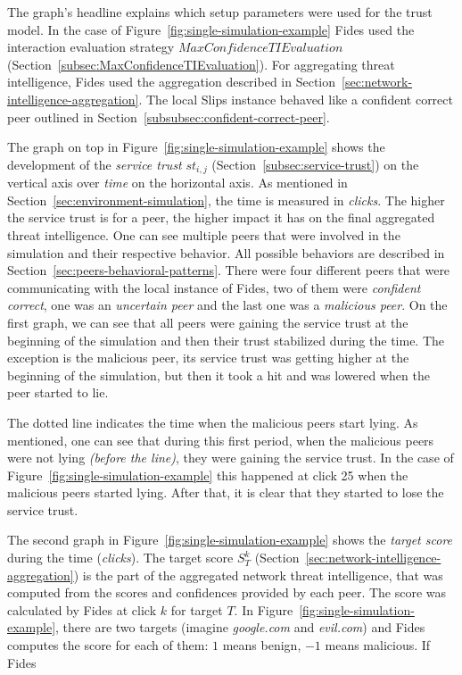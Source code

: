 The graph's headline explains which setup parameters were used for the trust model. In the case of Figure~\ref{fig:single-simulation-example} Fides used the interaction evaluation strategy $MaxConfidenceTIEvaluation$ (Section~\ref{subsec:MaxConfidenceTIEvaluation}).
For aggregating threat intelligence, Fides used the aggregation described in Section~\ref{sec:network-intelligence-aggregation}.
The local Slips instance behaved like a confident correct peer outlined in Section~\ref{subsubsec:confident-correct-peer}.

The graph on top in Figure~\ref{fig:single-simulation-example} shows the development of the \textit{service trust} $st_{i, j}$ (Section~\ref{subsec:service-trust}) on the vertical axis over \textit{time} on the horizontal axis. As mentioned in Section~\ref{sec:environment-simulation}, the time is measured in \textit{clicks}.
The higher the service trust is for a peer, the higher impact it has on the final aggregated threat intelligence.
One can see multiple peers that were involved in the simulation and their respective behavior. All possible behaviors are described in Section~\ref{sec:peers-behavioral-patterns}.
There were four different peers that were communicating with the local instance of Fides, two of them were \textit{confident correct}, one was an \textit{uncertain peer} and the last one was a \textit{malicious peer}.
On the first graph, we can see that all peers were gaining the service trust at the beginning of the simulation and then their trust stabilized during the time. The exception is the malicious peer, its service trust was getting higher at the beginning of the simulation, but then it took a hit and was lowered when the peer started to lie. 

The dotted line indicates the time when the malicious peers start lying.
As mentioned, one can see that during this first period, when the malicious peers were not lying \textit{(before the line)}, they were gaining the service trust.
In the case of Figure~\ref{fig:single-simulation-example} this happened at click 25 when the malicious peers started lying.
After that, it is clear that they started to lose the service trust.

The second graph in Figure~\ref{fig:single-simulation-example} shows the \textit{target score} during the time (\textit{clicks}).
The target score $S^{k}_{T}$ (Section~\ref{sec:network-intelligence-aggregation}) is the part of the aggregated network threat intelligence, that was computed from the scores and confidences provided by each peer. The score was calculated by Fides at click $k$ for target $T$.
In Figure~\ref{fig:single-simulation-example}, there are two targets (imagine \textit{google.com} and \textit{evil.com}) and Fides computes the score for each of them: $1$ means benign, $-1$ means malicious. 
If Fides 


